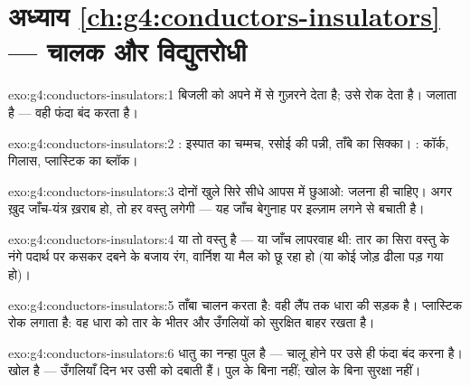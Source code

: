 \section*{अध्याय \ref{ch:g4:conductors-insulators} --- चालक और विद्युतरोधी}

\begin{solution}{exo:g4:conductors-insulators:1}
 बिजली को अपने में से गुज़रने देता है;  उसे रोक देता
है।   जलाता है --- वही फंदा बंद करता है।
\end{solution}

\begin{solution}{exo:g4:conductors-insulators:2}
: इस्पात का चम्मच, रसोई की पन्नी, ताँबे का सिक्का।
: कॉर्क, गिलास, प्लास्टिक का ब्लॉक।
\end{solution}

\begin{solution}{exo:g4:conductors-insulators:3}
दोनों खुले सिरे सीधे आपस में छुआओ:  जलना ही चाहिए। अगर ख़ुद
जाँच-यंत्र ख़राब हो, तो हर वस्तु  लगेगी --- यह जाँच बेगुनाह
पर इल्ज़ाम लगने से बचाती है।
\end{solution}

\begin{solution}{exo:g4:conductors-insulators:4}
या तो वस्तु  है --- या जाँच लापरवाह थी: तार का सिरा वस्तु
के नंगे पदार्थ पर कसकर दबने के बजाय रंग, वार्निश या मैल को छू रहा हो
(या कोई जोड़ ढीला पड़ गया हो)।
\end{solution}

\begin{solution}{exo:g4:conductors-insulators:5}
ताँबा चालन करता है: वही लैंप तक धारा की सड़क है। प्लास्टिक रोक लगाता
है: वह धारा को तार के भीतर और उँगलियों को सुरक्षित बाहर रखता है।
\end{solution}

\begin{solution}{exo:g4:conductors-insulators:6}
धातु का नन्हा पुल  है ---  चालू होने पर उसे ही फंदा बंद
करना है। खोल  है --- उँगलियाँ दिन भर उसी को दबाती हैं।
पुल के बिना  नहीं; खोल के बिना सुरक्षा नहीं।
\end{solution}

